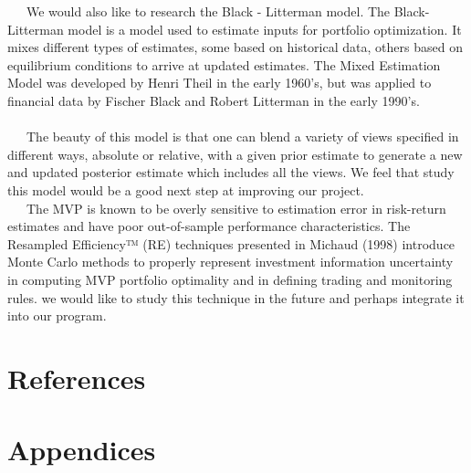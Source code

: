 \documentclass[12pt,titlepage,a4paper]{article}
\begin{document}
\ \ \ We would also like to research the Black - Litterman model. The Black-Litterman model is a model used to estimate inputs for portfolio optimization. It mixes different types of estimates, some based on historical data, others based on equilibrium conditions to arrive at updated estimates. The Mixed Estimation Model was developed by Henri Theil in the early 1960's, but was applied to financial data by Fischer Black and Robert Litterman in the early 1990's.\\
\\
\ \ \ The beauty of this model is that one can blend a variety of views specified in different ways, absolute or relative, with a given prior estimate to generate a new and updated posterior estimate which includes all the views.  We feel that study this model would be a good next step at improving our project.\\

\ \ \ The MVP is known to be overly sensitive to estimation error in risk-return estimates and have poor out-of-sample performance characteristics. The Resampled Efficiency™ (RE) techniques presented in Michaud (1998) introduce Monte Carlo methods to properly represent investment information uncertainty in computing MVP portfolio optimality and in defining trading and monitoring rules.  we would like to study this technique in the future and perhaps integrate it into our program.\\

\section{References}

\section{Appendices}
\end{document}
